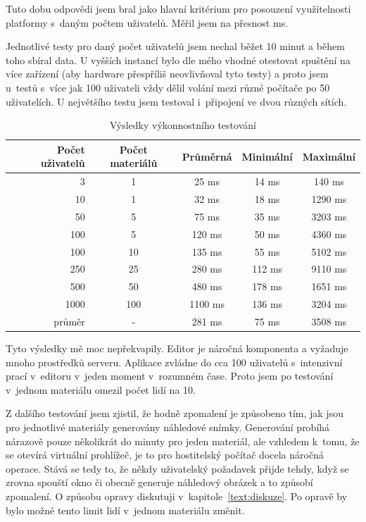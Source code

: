 Tuto dobu odpovědi jsem bral jako hlavní kritérium pro posouzení využitelnosti platformy s~daným počtem uživatelů.
Měřil jsem na přesnost ms.

Jednotlivé testy pro daný počet uživatelů jsem nechal běžet 10 minut a během toho sbíral data.
U vyšších instancí bylo dle mého vhodné otestovat spuštění na více zařízení (aby hardware přespříliš neovlivňoval tyto testy) a proto jsem u~testů s~více jak 100 uživateli vždy dělil volání mezi různé počítače po 50 uživatelích.
U největšího testu jsem testoval i~připojení ve dvou různých sítích.

\begin{table}[ht!]
    \caption{Výsledky výkonnostního testování}\label{tab:vysledkyTestovani}
    \centering
    \begin{tabular}{r|c|c|c|c}
        Počet uživatelů & Počet materiálů & Průměrná & Minimální & Maximální\\\hline\hline
        3 & 1 & 25 ms & 14 ms & 140 ms \\\hline
        10 & 1 & 32 ms & 18 ms & 1290 ms \\\hline
        50 & 5 & 75 ms & 35 ms & 3203 ms \\\hline
        100 & 5 & 120 ms & 50 ms & 4360 ms \\\hline
        100 & 10 & 135 ms & 55 ms & 5102 ms \\\hline
        250 & 25 & 280 ms & 112 ms & 9110 ms \\\hline
        500 & 50 & 480 ms & 178 ms & 1651 ms \\\hline
        1000 & 100 & 1100 ms & 136 ms & 3204 ms \\\hline\hline
        průměr & - & 281 ms & 75 ms & 3508 ms
    \end{tabular}
\end{table}

Tyto výsledky mě moc nepřekvapily.
Editor je náročná komponenta a vyžaduje mnoho prostředků serveru.
Aplikace zvládne do cca 100 uživatelů s~intenzivní prací v~editoru v~jeden moment v~rozumném čase.
Proto jsem po testování v~jednom materiálu omezil počet lidí na 10.

Z dalšího testování jsem zjistil, že hodně zpomalení je způsobeno tím, jak jsou pro jednotlivé materiály generovány náhledové snímky.
Generování probíhá nárazově pouze několikrát do minuty pro jeden materiál, ale vzhledem k~tomu, že se otevírá virtuální prohlížeč, je to pro hostitelský počítač docela náročná operace.
Stává se tedy to, že někdy uživatelský požadavek přijde tehdy, když se zrovna spouští okno či obecně generuje náhledový obrázek a to způsobí zpomalení.
O způsobu opravy diskutuji v~kapitole~\ref{text:diskuze}.
Po opravě by bylo možné tento limit lidí v~jednom materiálu změnit.

